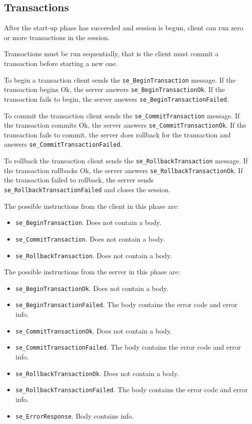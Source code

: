 \documentclass[a4paper,12pt]{article}
\newenvironment{citemize}
{\begin{itemize}
  \setlength{\itemsep}{0pt}
  \setlength{\parskip}{0pt}
  \setlength{\parsep}{0pt}}
{\end{itemize}}
\begin{document}
\subsection{Transactions}

After the start-up phase has succeeded and session is begun, client can run zero
or more transactions in the session.

Transactions must be run sequentially, that is the client must commit a
transaction before starting a new one.

To begin a transaction client sends the \verb!se_BeginTransaction! message. If
the transaction begins Ok, the server answers \verb!se_BeginTransactionOk!. If
the transaction fails to begin, the server answers
\verb!se_BeginTransactionFailed!.

To commit the transaction client sends the \verb!se_CommitTransaction! message.
If the transaction commits Ok, the server answers \verb!se_CommitTransactionOk!.
If the transaction fails to commit, the server does rollback for the transaction
and answers \verb!se_CommitTransactionFailed!.

To rollback the transaction client sends the \verb!se_RollbackTransaction!
message. If the transaction rollbacks Ok, the server answers
\verb!se_RollbackTransactionOk!. If the transaction failed to rollback, the
server sends \verb!se_RollbackTransactionFailed! and closes the session.

The possible instructions from the client in this phase are:
\begin{citemize}
\item \verb!se_BeginTransaction!. Does not contain a body.
\item \verb!se_CommitTransaction!. Does not contain a body.
\item \verb!se_RollbackTransaction!. Does not contain a body.
\end{citemize}

The possible instructions from the server in this phase are:
\begin{citemize}
\item \verb!se_BeginTransactionOk!. Does not contain a body.
\item \verb!se_BeginTransactionFailed!. The body contains the error code and
error info.
\item \verb!se_CommitTransactionOk!. Does not contain a body.
\item \verb!se_CommitTransactionFailed!. The body contains the error code and
error info.
\item \verb!se_RollbackTransactionOk!. Does not contain a body.
\item \verb!se_RollbackTransactionFailed!. The body contains the error code and
error info.
\item \verb!se_ErrorResponse!. Body contains info.
\end{citemize}
\end{document}
